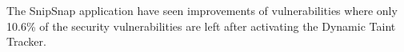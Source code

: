 The SnipSnap \parencite{snipsnap} application have seen improvements of vulnerabilities where only 10.6\% of the security vulnerabilities are left after activating the Dynamic Taint Tracker.


\begin{table}[H]
  \centering
  \caption{Security Vulnerabilities Found in SnipSnap}
  \label{table:SnipSnapTable}
\end{table}
